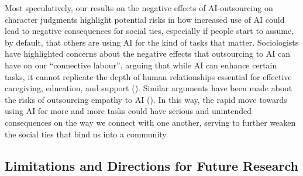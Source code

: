 \documentclass[
  man,
  floatsintext,
  longtable,
  nolmodern,
  notxfonts,
  notimes,
  colorlinks=true,linkcolor=blue,citecolor=blue,urlcolor=blue]{apa7}
\begin{document}
Most speculatively, our results on the negative effects of
AI-outsourcing on character judgments highlight potential risks in how
increased use of AI could lead to negative consequences for social ties,
especially if people start to assume, by default, that others are using
AI for the kind of tasks that matter. Sociologists have highlighted
concerns about the negative effects that outsourcing to AI can have on
our ``connective labour'', arguing that while AI can enhance certain
tasks, it cannot replicate the depth of human relationships essential
for effective caregiving, education, and support
(). Similar arguments have been made
about the risks of outsourcing empathy to AI
(). In this way, the
rapid move towards using AI for more and more tasks could have serious
and unintended consequences on the way we connect with one another,
serving to further weaken the social ties that bind us into a community.

\subsection*{Limitations and Directions for Future
Research}\label{limitations-and-directions-for-future-research}
\end{document}
